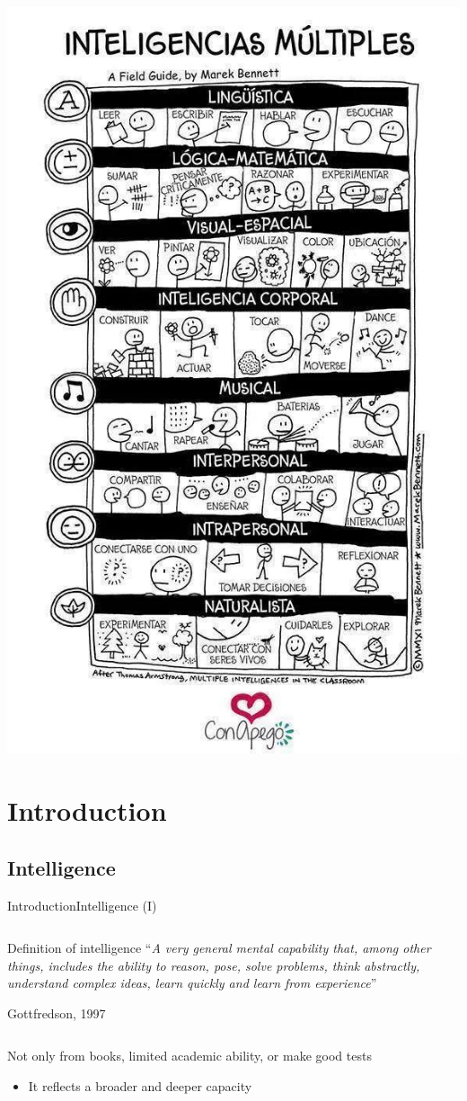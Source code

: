\documentclass[10pt,compress]{beamer} %
\begin{document}
\begin{frame}[plain]{}
	\vspace{-0.4cm}
	\begin{center}
	\includegraphics[width=0.6\linewidth]{figs/inteligencia.jpg}
	\end{center}
\end{frame}

\section{Introduction}

\subsection{Intelligence}
\begin{frame}{Introduction}{Intelligence (I)}
	\begin{columns}
		\begin{block}{Definition of intelligence}
			``\textit{A very general mental capability that, among other things, includes the ability to reason, pose, solve problems, think abstractly, understand complex ideas, learn quickly and learn from experience}''\\
			\begin{flushright}Gottfredson, 1997\end{flushright}
		\end{block}
	\end{columns}
	\bigskip
	Not only from books, limited academic ability, or make good tests
	\begin{itemize}
		\item It reflects a broader and deeper capacity
	\end{itemize}
\end{frame}
\end{document}
